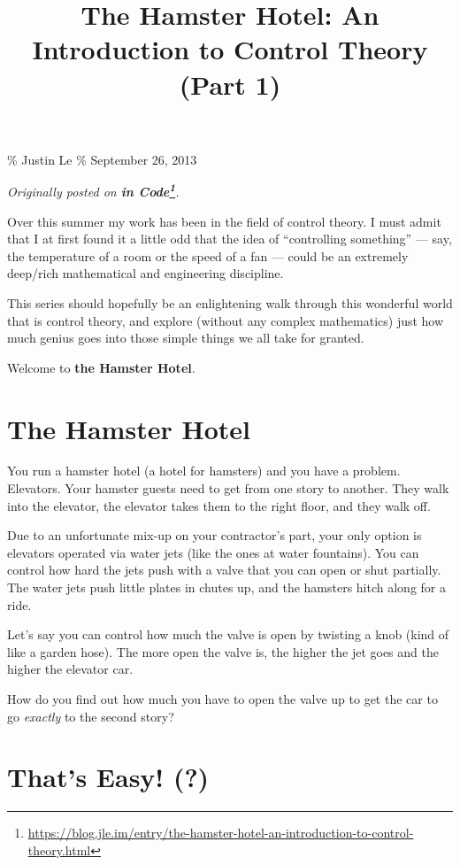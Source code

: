 \documentclass[]{article}
\title{The Hamster Hotel: An Introduction to Control Theory (Part 1)}
\renewcommand{\href}[2]{#2\footnote{\url{#1}}}
\begin{document}
\maketitle

\% Justin Le \% September 26, 2013

\emph{Originally posted on
\textbf{\href{https://blog.jle.im/entry/the-hamster-hotel-an-introduction-to-control-theory.html}{in
Code}}.}

Over this summer my work has been in the field of control theory. I must admit
that I at first found it a little odd that the idea of ``controlling something''
--- say, the temperature of a room or the speed of a fan --- could be an
extremely deep/rich mathematical and engineering discipline.

This series should hopefully be an enlightening walk through this wonderful
world that is control theory, and explore (without any complex mathematics) just
how much genius goes into those simple things we all take for granted.

Welcome to \textbf{the Hamster Hotel}.

\section{The Hamster Hotel}\label{the-hamster-hotel}

You run a hamster hotel (a hotel for hamsters) and you have a problem.
Elevators. Your hamster guests need to get from one story to another. They walk
into the elevator, the elevator takes them to the right floor, and they walk
off.

Due to an unfortunate mix-up on your contractor's part, your only option is
elevators operated via water jets (like the ones at water fountains). You can
control how hard the jets push with a valve that you can open or shut partially.
The water jets push little plates in chutes up, and the hamsters hitch along for
a ride.

Let's say you can control how much the valve is open by twisting a knob (kind of
like a garden hose). The more open the valve is, the higher the jet goes and the
higher the elevator car.

How do you find out how much you have to open the valve up to get the car to go
\emph{exactly} to the second story?

\section{That's Easy! (?)}\label{thats-easy}
\end{document}
